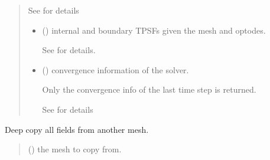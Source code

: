 \documentclass[letterpaper,10pt,english]{sphinxmanual}
\begin{document}
\begin{fulllineitems}
\begin{fulllineitems}
\begin{quote}
\begin{description}
\begin{itemize}
\sphinxAtStartPar
See {\hyperref[\detokenize{_autosummary/nirfasterff.utils.SolverOptions:nirfasterff.utils.SolverOptions}]{}} for details


\end{itemize}

\sphinxAtStartPar
\begin{itemize}
\item {} 
\sphinxAtStartPar
{} () \textendash{} internal and boundary TPSFs given the mesh and optodes.

\sphinxAtStartPar
See {\hyperref[\detokenize{_autosummary/nirfasterff.base.data.TPSFdata:nirfasterff.base.data.TPSFdata}]{}} for details.

\item {} 
\sphinxAtStartPar
{} () \textendash{} convergence information of the solver.

\sphinxAtStartPar
Only the convergence info of the last time step is returned.

\sphinxAtStartPar
See {\hyperref[\detokenize{_autosummary/nirfasterff.utils.ConvergenceInfo:nirfasterff.utils.ConvergenceInfo}]{}} for details

\end{itemize}


\end{description}\end{quote}

\end{fulllineitems}


\begin{fulllineitems}
\label{\detokenize{_autosummary/nirfasterff.base.stnd_mesh.stndmesh:nirfasterff.base.stnd_mesh.stndmesh.from_copy}}
\pysigstartsignatures
\pysiglinewithargsret
{}
{}
{}
\pysigstopsignatures
\sphinxAtStartPar
Deep copy all fields from another mesh.
\begin{quote}\begin{description}
\sphinxAtStartPar
{} () \textendash{} the mesh to copy from.


\end{description}
\end{quote}
\end{fulllineitems}
\end{fulllineitems}
\end{document}
